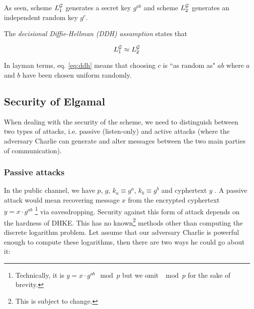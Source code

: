As seen, scheme \( L_1^{\mathcal{G}} \) generates a secret key \( g^{ab} \) and scheme \( L_2^{\mathcal{G}} \) generates an independent random key \( g^c \).

The \textit{decisional Diffie-Hellman (DDH) assumption} states that

\begin{equation} \label{eq:ddh} 
    L_1^{\mathcal{G}} \approx L_2^{\mathcal{G}}
\end{equation}

In layman terms, eq. \ref{eq:ddh} means that choosing \( c \) is ``as random as" \( ab \) where \( a \) and \( b \) have been chosen uniform randomly.

\subsection{Security of Elgamal}

When dealing with the security of the scheme, we need to distinguish between two types of attacks, i.e. passive (listen-only) and active attacks (where the adversary Charlie can generate and alter messages between the two main parties of communication).

\subsubsection{Passive attacks}

In the public channel, we have \( p \), \( g \), \( k_a \equiv g^a \), \( k_b \equiv g^b \) and cyphertext \( y \) . A passive attack would mean recovering message \( x \) from the encrypted cyphertext \( y = x \cdot g^{ab} \)\textsuperscript{   }\footnote{Technically, it is \( y = x \cdot g^{ab} \mod p \) but we omit \( \mod p \) for the sake of brevity.} via eavesdropping.
Security against this form of attack depends on the hardness of DHKE. 
This has no known\footnote{This is subject to change.} methods other than computing the discrete logarithm problem.
Let assume that our adversary Charlie is powerful enough to compute these logarithms, then there are two ways he could go about it:

